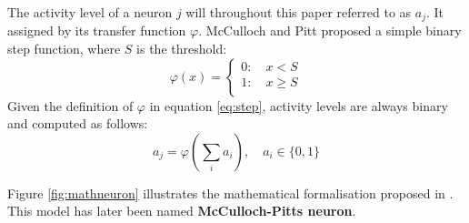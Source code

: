 \documentclass[10pt,a4paper,DIV=11]{scrreprt}
\begin{document}
The activity level of a neuron $j$ will throughout this paper referred to as $a_j$. It assigned by its transfer function $\varphi$. 
McCulloch and Pitt proposed a simple binary step function, where $S$ is the threshold:\\

\begin{equation}
	\varphi(x)=\begin{cases}
		0: \quad  x < S \\
		1: \quad  x \geq S \\
	\end{cases}
\label{eq:step}
\end{equation}
Given the definition of $\varphi$ in equation \eqref{eq:step}, activity levels are always binary and computed as follows:\\

\begin{equation}
a_j = \varphi(\sum_{i}^{} a_{i}), \quad a_i \in \{0, 1\}
\end{equation}

Figure \ref{fig:mathneuron} illustrates the mathematical formalisation proposed in \cite{NEURONMATH}. This model has later been 
named \textbf{McCulloch-Pitts neuron}. 
\end{document}
